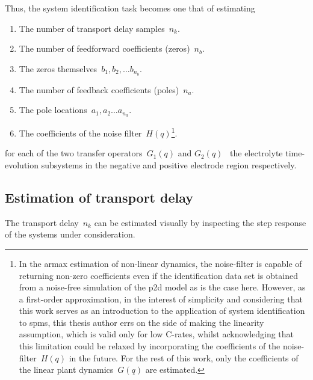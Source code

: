 
Thus, the system identification task becomes one that of estimating
\begin{enumerate}
    \item The number of transport delay samples~$n_k$.
    \item The number of feedforward coefficients (zeros)~$n_b$.
    \item The zeros themselves~${b_1, b_2, \dots b_{n_b}}$.
    \item The number of feedback coefficients (poles)~$n_a$.
    \item The pole locations~${a_1, a_2 \dots a_{n_a}}$.
    \item The coefficients of the noise filter~$H(q)$\footnote{In the \gls{armax} estimation of non-linear dynamics, the
noise-filter is capable of returning non-zero coefficients even if the
identification data set is obtained from a \gls{noise-free} simulation of the
\gls{p2d} model as is the case here. However, as a first-order approximation, in
the interest of simplicity and considering that this work serves as an
introduction to the application of system identification to \glspl{spm}, this thesis author errs on
the side of making the linearity assumption, which is valid only for low
C-rates, whilst acknowledging that this
limitation could be relaxed by incorporating the coefficients of the
noise-filter~$H(q)$ in the future. For the rest of this work, only the
coefficients of the linear plant dynamics~$G(q)$ are estimated.}.
\end{enumerate}
for  each  of  the  two  transfer operators~$G_1(q)$  and  $G_2(q)$  \ie~the
electrolyte  time-evolution subsystems  in the  negative and  positive electrode
region respectively.

\subsection{Estimation of transport delay}

The transport delay~$n_k$ can be estimated visually by inspecting the step
response of the systems under consideration.

